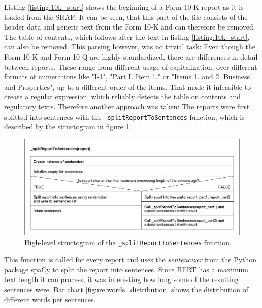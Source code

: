 \FloatBarrier

Listing \ref{listing:10k_start} shows the beginning of a Form 10-K report as it is loaded from the \ac{SRAF}.
It can be seen, that this part of the file consists of the header data and generic text from the Form 10-K and can therefore be removed.
The table of contents, which follows after the text in listing \ref{listing:10k_start}, can also be removed.
This parsing however, was no trivial task:
Even though the Form 10-K and Form 10-Q are highly standardized, there are differences in detail between reports.
These range from different usage of capitalization, over different formats of numerations like "I-1", "Part I. Item 1." or "Items 1. and 2. Business and Properties", up to a different order of the items.
That made it infeasible to create a regular expression, which reliably detects the table on contents and regulatory texts.
Therefore another approach was taken: The reports were first splitted into sentences with the \texttt{\_splitReportToSentences} function, which is described by the structogram in figure \ref{figure:structogram_splitReportToSentences}.
\begin{figure}[h]
    \centering
    \includegraphics[width=1\textwidth]{figures/structogram_splitReportToSentences.png}
    \caption{High-level structogram of the \texttt{\_splitReportToSentences} function.}
    \label{figure:structogram_splitReportToSentences}
\end{figure}
This function is called for every report and uses the \textit{sentencizer} from the Python package spaCy to split the report into sentences.
Since \acs{BERT} has a maximum text length it can process, it was interesting how long some of the resulting sentences were. %
Bar chart \ref{figure:words_distribution} shows the distribution of different words per sentences.

